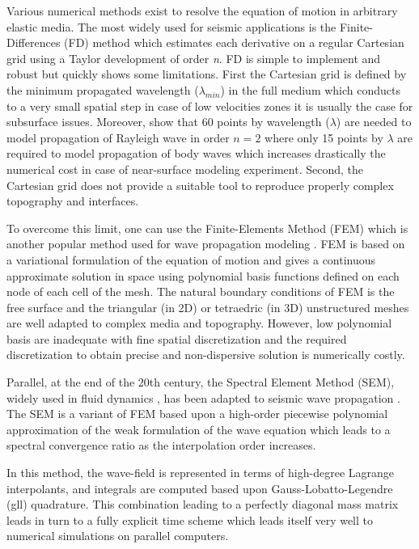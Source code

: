 \documentclass[manuscript,revised]{geophysics}
\begin{document}
\noindent Various numerical methods exist to resolve the equation of motion in arbitrary elastic media. The most widely used for seismic applications is the Finite-Differences (FD) method \citep{Virieux_PSV_1986,Levander_PSV_1988,Robertsson_FDM_1994,Pratt_EWM_1990,Stekl_VEM_1998,Saenger_FDM_2004} which estimates each derivative on a regular Cartesian grid using a Taylor development \citep{Moczo_FDM_2004} of order \textit{n}. FD is simple to implement and robust but quickly shows some limitations. First the Cartesian grid is defined by the minimum propagated wavelength ($\lambda_{min}$) in the full medium which conducts to a very small spatial step in case of low velocities zones it is usually the case for subsurface issues. Moreover, \citet{Saenger_FDM_2000} show that 60 points by wavelength ($\lambda$) are needed to model propagation of Rayleigh wave in order $n=2$ where only 15 points by $\lambda$ are required to model propagation of body waves which increases drastically the numerical cost in case of near-surface modeling experiment. Second, the Cartesian grid does not provide a suitable tool to reproduce properly complex topography and interfaces. 

\noindent To overcome this limit, one can use the Finite-Elements Method (FEM) which is another popular method used for wave propagation modeling \citep{Lysmer_FEM_1972,Seron_FEM_1990,Hulbert_FEM_1990}. FEM is based on a variational formulation of the equation of motion and gives a continuous approximate solution in space using polynomial basis functions defined on each node of each cell of the mesh. The natural boundary conditions of FEM is the free surface and the triangular (in 2D) or tetraedric (in 3D) unstructured meshes are well adapted to complex media and topography. However, low polynomial basis are inadequate with fine spatial discretization and the required discretization to obtain precise and non-dispersive solution is numerically costly. 

\noindent Parallel, at the end of the 20th century, the Spectral Element Method (SEM), widely used in fluid dynamics \citep{Patera_SEM_1984,Korczak_SEM_1986,Karniadakis_FEM_1989}, has been adapted to seismic wave propagation \citep{Komatitsch_SEM_1998,Komatitsch_ISM_1999,Komatitsch_SEM_2005,Festa_PML_2005}. The SEM is a variant of FEM based upon a high-order piecewise polynomial approximation of the weak formulation of the wave equation which leads to a spectral convergence ratio as the interpolation order increases. 

\noindent In this method, the wave-field is represented in terms of high-degree Lagrange interpolants, and integrals are computed based upon Gauss-Lobatto-Legendre (gll) quadrature. This combination leading to a perfectly diagonal mass matrix leads in turn to a fully explicit time scheme which leads itself very well to numerical simulations on parallel computers.
\end{document}
